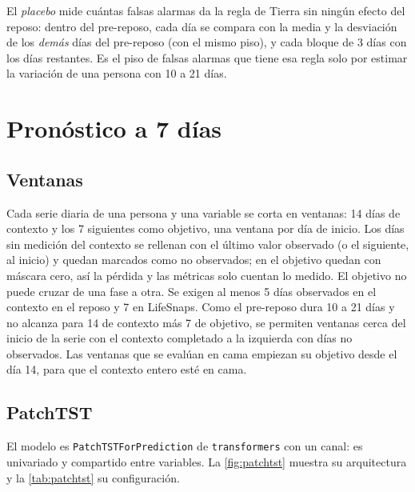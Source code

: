 El \emph{placebo} mide cuántas falsas alarmas da la regla de Tierra sin ningún efecto del reposo: dentro del pre-reposo,
cada día se compara con la media y la desviación de los \emph{demás} días del pre-reposo (con el mismo piso), y cada
bloque de 3 días con los días restantes. Es el piso de falsas alarmas que tiene esa regla solo por estimar la
variación de una persona con 10 a 21 días.

\section{Pronóstico a 7 días}\label{sec:pronostico}

\subsection{Ventanas}

Cada serie diaria de una persona y una variable se corta en ventanas: 14 días de contexto y los 7 siguientes como
objetivo, una ventana por día de inicio. Los días sin medición del contexto se rellenan con el último valor observado
(o el siguiente, al inicio) y quedan marcados como no observados; en el objetivo quedan con máscara cero, así la
pérdida y las métricas solo cuentan lo medido. El objetivo no puede cruzar de una fase a otra. Se exigen al menos 5
días observados en el contexto en el reposo y 7 en LifeSnaps. Como el pre-reposo dura 10 a 21 días y no alcanza para
14 de contexto más 7 de objetivo, se permiten ventanas cerca del inicio de la serie con el contexto completado a la
izquierda con días no observados. Las ventanas que se evalúan en cama empiezan su objetivo desde el día 14, para que el
contexto entero esté en cama.

\subsection{PatchTST}

El modelo es \texttt{PatchTSTForPrediction} de \texttt{transformers} \parencite{nie2023,wolf2020} con un canal: es
univariado y compartido entre variables. La \cref{fig:patchtst} muestra su arquitectura y la \cref{tab:patchtst} su
configuración.

